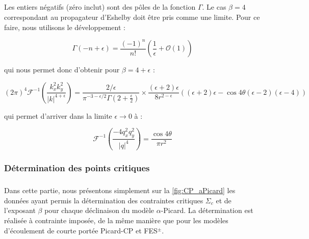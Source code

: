 \subparagraph{}Les entiers négatifs (zéro inclut) sont des pôles de la fonction $\Gamma$. Le cas $\beta = 4$ correspondant au propagateur d'Eshelby doit être pris comme une limite. Pour ce faire, nous utilisons le développement :

\begin{equation}
    \Gamma(-n+\epsilon) = \frac{(-1)^n}{n!}\left( \frac{1}{\epsilon}+\mathcal{O}(1) \right)
\end{equation}

\noindent qui nous permet donc d'obtenir pour $\beta=4+\epsilon$ :

\begin{equation}
    (2\pi)^4\mathcal{F}^{-1}\left( \frac{k_x^2k_y^2}{\lvert k \rvert^{4+\epsilon}} \right)=\frac{2/\epsilon}{\pi^{-3-\epsilon/2}\Gamma\left( 2+\frac{\epsilon}{2} \right)}\times\frac{(\epsilon+2)\epsilon}{8r^{2-\epsilon}}((\epsilon+2)\epsilon-\cos4\theta(\epsilon-2)(\epsilon-4))
\end{equation}

\noindent qui permet d'arriver dans la limite $\epsilon \rightarrow 0$ à :

\begin{equation}
    \mathcal{F}^{-1}\left( \frac{-4q_x^2q_y^2}{\lvert q \rvert^{4}} \right)=\frac{\cos4\theta}{\pi r^2}
\end{equation}

\subsubsection{Détermination des points critiques}

\label{sec:CP_aPicard}

\subparagraph{}Dans cette partie, nous présentons simplement sur la \autoref{fig:CP_aPicard} les données ayant permis la détermination des contraintes critiques $\Sigma_c$ et de l'exposant $\beta$ pour chaque déclinaison du modèle $\alpha$-Picard. La détermination est réalisée à contrainte imposée, de la même manière que pour les modèles d'écoulement de courte portée Picard-CP et FES$^\pm$.


